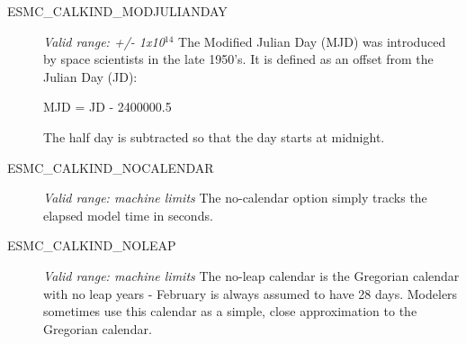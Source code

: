 \begin{description}
\item [ESMC\_CALKIND\_MODJULIANDAY]
{\it Valid range:  +/- 1x10$^{14}$}
\newline The Modified Julian Day (MJD) was introduced by space scientists in
 the late 1950's.  It is defined as an offset from the Julian Day (JD):

MJD = JD - 2400000.5

The half day is subtracted so that the day starts at midnight.

\item [ESMC\_CALKIND\_NOCALENDAR] 
{\it Valid range: machine limits}
\newline The no-calendar option simply tracks the elapsed model time in seconds.

\item [ESMC\_CALKIND\_NOLEAP]
{\it Valid range: machine limits} 
\newline The no-leap calendar is the Gregorian calendar with no leap years - 
February is always assumed to have 28 days.  Modelers sometimes use this 
calendar as a simple, close approximation to the Gregorian calendar.

\end{description}
